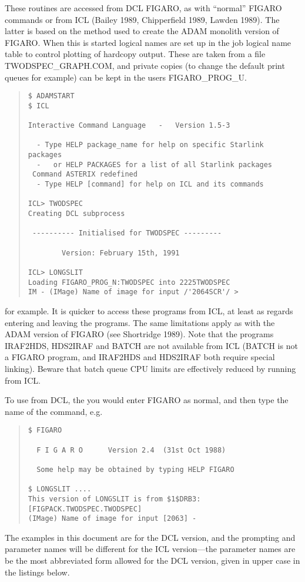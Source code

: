These routines are accessed from DCL FIGARO, as with ``normal'' FIGARO
commands or from ICL (Bailey 1989, Chipperfield 1989, Lawden 1989).
The latter is based on the method used to create the ADAM monolith
version of FIGARO.
When this is started logical names are set up in the job logical name
table to control plotting of hardcopy output.
These are taken from a file TWODSPEC\_GRAPH.COM, and private copies (to
change the default print queues for example) can be kept in the users
FIGARO\_PROG\_U.
\begin{quote}\begin{verbatim}
$ ADAMSTART
$ ICL

Interactive Command Language   -   Version 1.5-3

  - Type HELP package_name for help on specific Starlink packages
  -   or HELP PACKAGES for a list of all Starlink packages
 Command ASTERIX redefined
  - Type HELP [command] for help on ICL and its commands

ICL> TWODSPEC
Creating DCL subprocess

 ---------- Initialised for TWODSPEC ---------

        Version: February 15th, 1991

ICL> LONGSLIT
Loading FIGARO_PROG_N:TWODSPEC into 2225TWODSPEC
IM - (IMage) Name of image for input /'2064SCR'/ >
\end{verbatim}\end{quote}
for example.
It is quicker to access these programs from ICL, at least as regards
entering and leaving the programs.
The same limitations apply as with the ADAM version of FIGARO (see
Shortridge 1989).
Note that the programs IRAF2HDS, HDS2IRAF and BATCH are not available
from ICL (BATCH is not a FIGARO program, and IRAF2HDS and HDS2IRAF both
require special linking).
Beware that batch queue CPU limits are effectively reduced by running
from ICL.

To use from DCL, the you would enter FIGARO as normal, and then type the
name of the command, e.g.
\begin{quote}\begin{verbatim}
$ FIGARO
  
  F I G A R O      Version 2.4  (31st Oct 1988)
  
  Some help may be obtained by typing HELP FIGARO
  
$ LONGSLIT ....
This version of LONGSLIT is from $1$DRB3:[FIGPACK.TWODSPEC.TWODSPEC]
(IMage) Name of image for input [2063] - 
\end{verbatim}\end{quote}
The examples in this document are for the DCL version, and the prompting
and parameter names will be different for the ICL version---the
parameter names are be the most abbreviated form allowed for the DCL
version, given in upper case in the listings below.

